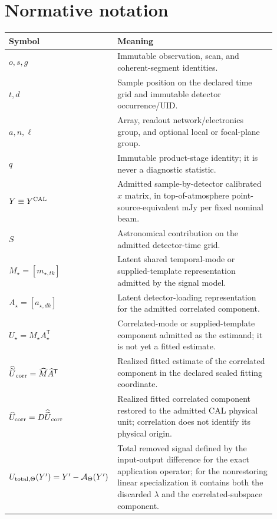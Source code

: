 \section{Normative notation}
\label{sec:normative-notation}

\begin{longtable}{>{\raggedright\arraybackslash}p{0.22\linewidth}
                  >{\raggedright\arraybackslash}p{0.68\linewidth}}
\toprule
Symbol & Meaning \\
\midrule
\endhead
$o,s,g$ & Immutable observation, scan, and coherent-segment identities. \\
$t,d$ & Sample position on the declared time grid and immutable detector occurrence/UID. \\
$a,n,\ell$ & Array, readout network/electronics group, and optional local or focal-plane group. \\
$q$ & Immutable product-stage identity; it is never a diagnostic statistic. \\
$Y\equiv Y^{\rm CAL}$ & Admitted sample-by-detector calibrated $x$ matrix, in top-of-atmosphere point-source-equivalent mJy per fixed nominal beam. \\
$S$ & Astronomical contribution on the admitted detector-time grid. \\
$M_\star=[m_{\star,tk}]$ & Latent shared temporal-mode or supplied-template representation admitted by the signal model. \\
$A_\star=[a_{\star,dk}]$ & Latent detector-loading representation for the admitted correlated component. \\
$U_\star=M_\star A_\star^{\mathsf T}$ & Correlated-mode or supplied-template component admitted as the estimand; it is not yet a fitted estimate. \\
$\widehat{\widetilde U}_{\rm corr}=\widehat M\widehat A^{\mathsf T}$ & Realized fitted estimate of the correlated component in the declared scaled fitting coordinate. \\
$\widehat U_{\rm corr}=D\widehat{\widetilde U}_{\rm corr}$ & Realized fitted correlated component restored to the admitted CAL physical unit; correlation does not identify its physical origin. \\
$U_{{\rm total},\Theta}(Y')=Y'-\mathcal A_\Theta(Y')$ & Total removed signal defined by the input-output difference for the exact application operator; for the nonrestoring linear specialization it contains both the discarded $\lambda$ and the correlated-subspace component. \\

\end{longtable}
